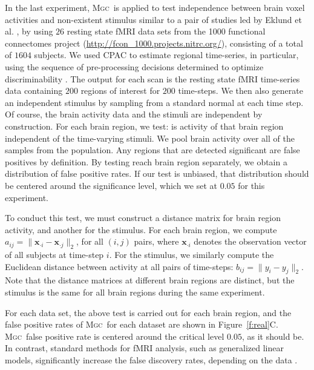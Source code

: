 \documentclass[11pt]{article}
\newcommand{\note}[2][]{\added[#1,remark={#2}]{}}
\providecommand{\sct}[1]{{\normalfont\textsc{#1}}}
\providecommand{\mb}[1]{\boldsymbol{#1}}
\newcommand{\Mgc}{\sct{Mgc}}
\newcommand{\jv}[1]{{\note{jv: #1}}}
\newcommand{\mbx}{\ensuremath{\mb{x}}}
\begin{document}
In the last experiment, \Mgc~is applied to test independence between brain voxel activities and non-existent stimulus similar to a pair of studies led by Eklund et al. \cite{EklundKnutsson2012,Eklund2015}, by using $26$ resting state fMRI data sets from the 1000 functional connectomes project (\url{http://fcon_1000.projects.nitrc.org/}), consisting of a total of $1604$ subjects.
We used CPAC \cite{CPAC2015} to estimate regional time-series, in particular, using the sequence of pre-processing decisions determined to optimize discriminability \cite{Wang2016}.  The output for each scan is the resting state fMRI time-series data containing $200$ regions of interest for $200$ time-steps.
We then also generate an independent stimulus  by sampling from a standard normal at each time step.  Of course, the brain activity data and the stimuli are independent by construction.
For each brain region, we test: is activity of that  brain region independent of the time-varying stimuli. We pool brain activity over all of the samples from the population.
Any regions that are detected significant are false positives by definition.  By testing reach brain region separately, we obtain a distribution of false positive rates.  If our test is unbiased, that distribution should be centered around the significance level, which we set at $0.05$ for this experiment.

To conduct this test, we must construct a distance matrix for brain region activity, and another for the stimulus. For each brain region, we compute $a_{ij}=\|\mbx_{\cdot i}-\mbx_{\cdot j}\|_2$, for all $(i,j)$ pairs,  where $\mbx_{\cdot i}$ denotes the observation vector of all subjects at time-step $i$.
For the stimulus, we similarly compute the Euclidean distance between activity at all pairs of time-steps: $b_{ij}= \|y_i - y_j\|_2$.
Note that the distance matrices at different brain regions are distinct, but the stimulus is the same for all brain regions during the same experiment.

For each data set, the above test is carried out for each brain region, and the false positive rates of \Mgc~for each dataset are shown in Figure~\ref{f:real}C. %
\Mgc~false positive rate is centered around the critical level $0.05$, as it should be.
In contrast,  standard methods for fMRI analysis, such as generalized linear models, significantly increase the false discovery rates, depending on the data \cite{EklundKnutsson2012,Eklund2015}.
\jv{you wrote "`significantly increase or decrease"', I delete the decrease part, because decreasing the FDR is actually a good thing, and in their paper they solely concentrate on FDR increase?!}
\end{document}
